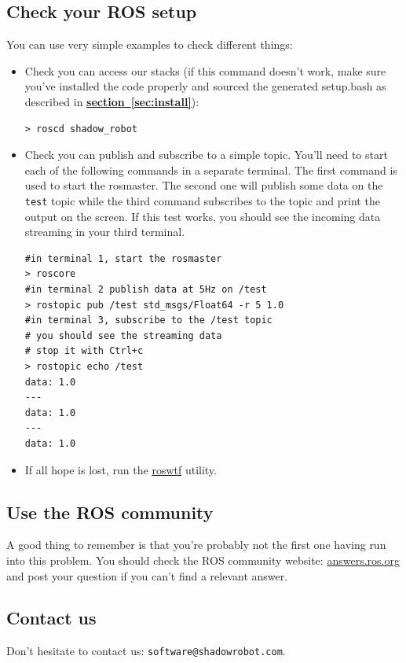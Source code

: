 \documentclass[12pt]{article}
\newcommand{\link}[1]{\hyperref[sec:#1]{\textbf{section~\ref*{sec:#1}}}}
\begin{document}
\subsection{Check your ROS setup}
\par You can use very simple examples to check different things:
\begin{itemize}
\item Check you can access our stacks (if this command doesn't work, make sure you've installed the code properly and sourced the generated setup.bash as described in \link{install}):
  \begin{lstlisting}[escapeinside='']
> roscd shadow_robot
  \end{lstlisting}

\item Check you can publish and subscribe to a simple topic. You'll need to start each of the following commands in a separate terminal. The first command is used to start the rosmaster. The second one will publish some data on the \texttt{test} topic while the third command subscribes to the topic and print the output on the screen. If this test works, you should see the incoming data streaming in your third terminal.

  \begin{lstlisting}[escapeinside='']
#in terminal 1, start the rosmaster
> roscore
#in terminal 2 publish data at 5Hz on /test
> rostopic pub /test std_msgs/Float64 -r 5 1.0
#in terminal 3, subscribe to the /test topic
# you should see the streaming data
# stop it with Ctrl+c
> rostopic echo /test
data: 1.0
---
data: 1.0
---
data: 1.0
  \end{lstlisting}

\item If all hope is lost, run the \href{http://ros.org/wiki/roswtf}{roswtf} utility.
\end{itemize}

\subsection{Use the ROS community}
\label{sec:use-ros-community}
\par A good thing to remember is that you're probably not the first one having run into this problem. You should check the ROS community website: \href{http://answers.ros.org}{answers.ros.org} and post your question if you can't find a relevant answer.

\subsection{Contact us}
\par Don't hesitate to contact us: \texttt{software@shadowrobot.com}.
\end{document}
